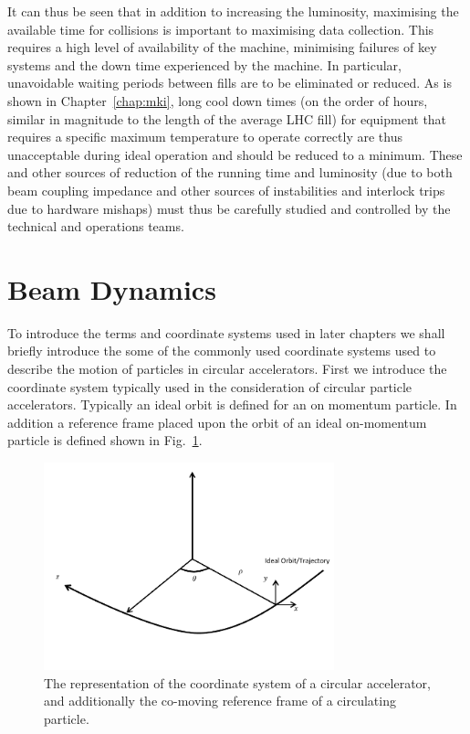It can thus be seen that in addition to increasing the luminosity, maximising the available time for collisions is important to maximising data collection. This requires a high level of availability of the machine, minimising failures of key systems and the down time experienced by the machine. In particular, unavoidable waiting periods between fills are to be eliminated or reduced. As is shown in Chapter~\ref{chap:mki}, long cool down times (on the order of hours, similar in magnitude to the length of the average LHC fill) for equipment that requires a specific maximum temperature to operate correctly are thus unacceptable during ideal operation and should be reduced to a minimum. These and other sources of reduction of the running time and luminosity (due to both beam coupling impedance and other sources of instabilities and interlock trips due to hardware mishaps) must thus be carefully studied and controlled by the technical and operations teams.

\section{Beam Dynamics}
\label{sec:BeamDyn}

To introduce the terms and coordinate systems used in later chapters we shall briefly introduce the some of the commonly used coordinate systems used to describe the motion of particles in circular accelerators. First we introduce the coordinate system typically used in the consideration of circular particle accelerators. Typically an ideal orbit is defined for an on momentum particle. In addition a reference frame placed upon the orbit of an ideal on-momentum particle is defined shown in Fig.~\ref{fig:accel-coord-system}. 

\begin{figure}
\begin{center}
\includegraphics[width=0.75\textwidth]{Introduction/figures/coordinate-system.pdf}
\end{center}
\caption{The representation of the coordinate system of a circular accelerator, and additionally the co-moving reference frame of a circulating particle.}
\label{fig:accel-coord-system}
\end{figure}

